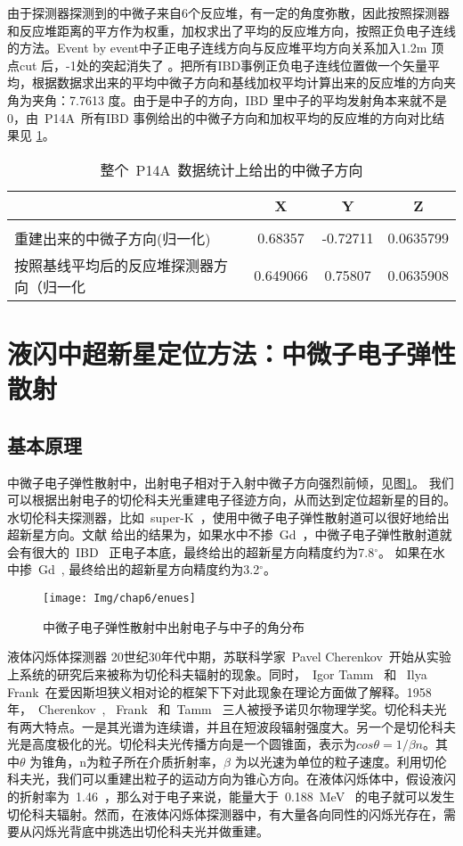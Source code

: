 由于探测器探测到的中微子来自6个反应堆，有一定的角度弥散，因此按照探测器和反应堆距离的平方作为权重，加权求出了平均的反应堆方向，按照正负电子连线的方法。Event by event中子正电子连线方向与反应堆平均方向关系加入1.2m 顶点cut 后，-1处的突起消失了 。把所有IBD事例正负电子连线位置做一个矢量平均，根据数据求出来的平均中微子方向和基线加权平均计算出来的反应堆的方向夹角为夹角：7.7613 度。由于是中子的方向，IBD 里中子的平均发射角本来就不是0，由~P14A~所有IBD 事例给出的中微子方向和加权平均的反应堆的方向对比结果见
\ref{tab:t64}。
\begin{table}[htbp]
\centering  %
\begin{tabular}{lccc}  %
\hline
&X &Y&Z\\\hline
\\重建出来的中微子方向(归一化)&0.68357 & -0.72711&0.0635799
\\按照基线平均后的反应堆探测器方向（归一化&0.649066&0.75807&0.0635908
\\ \hline
\end{tabular}
\caption{整个~P14A~数据统计上给出的中微子方向}
\label{tab:t64}
\end{table}
\section{液闪中超新星定位方法：中微子电子弹性散射}
\subsection{基本原理}
中微子电子弹性散射中，出射电子相对于入射中微子方向强烈前倾，见图\ref{fig:enues}。 我们可以根据出射电子的切伦科夫光重建电子径迹方向，从而达到定位超新星的目的。水切伦科夫探测器，比如~super-K~，使用中微子电子弹性散射道可以很好地给出超新星方向。文献\citep{tomas2003supernova} 给出的结果为，如果水中不掺~Gd~，中微子电子弹性散射道就会有很大的~IBD~ 正电子本底，最终给出的超新星方向精度约为7.8$ ^\circ $。 如果在水中掺~Gd~, 最终给出的超新星方向精度约为3.2$^\circ $。
\begin{figure}[!htbp]
  \centering
   \texttt{[image: Img/chap6/enues]}
    \caption{中微子电子弹性散射中出射电子与中子的角分布}
  \label{fig:enues}
\end{figure}
液体闪烁体探测器
20世纪30年代中期，苏联科学家~Pavel Cherenkov~开始从实验上系统的研究后来被称为切伦科夫辐射的现象。同时，~Igor Tamm~ 和 ~Ilya Frank~在爱因斯坦狭义相对论的框架下下对此现象在理论方面做了解释。1958 年，~Cherenkov~, ~Frank~ 和~Tamm~ 三人被授予诺贝尔物理学奖。切伦科夫光有两大特点。一是其光谱为连续谱，并且在短波段辐射强度大。另一个是切伦科夫光是高度极化的光。切伦科夫光传播方向是一个圆锥面，表示为$cos\theta = 1/ \beta n $。其中$\theta$ 为锥角，n为粒子所在介质折射率，$\beta$ 为以光速为单位的粒子速度。利用切伦科夫光，我们可以重建出粒子的运动方向为锥心方向。在液体闪烁体中，假设液闪的折射率为~1.46~，那么对于电子来说，能量大于~0.188~MeV~ 的电子就可以发生切伦科夫辐射。然而，在液体闪烁体探测器中，有大量各向同性的闪烁光存在，需要从闪烁光背底中挑选出切伦科夫光并做重建。

